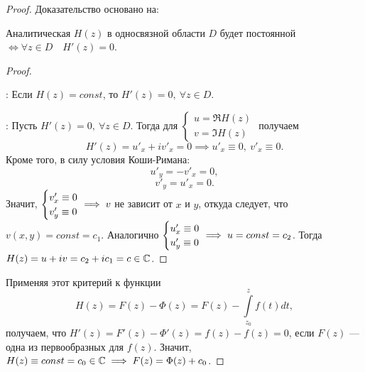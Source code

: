 \documentclass[../../main.tex]{subfiles}
\begin{document}
\begin{proof}
Доказательство основано на:
\begin{thm}
	Аналитическая $H(z)$ в односвязной области $D$ будет постоянной
	$\iff \forall z \in D \quad H'(z) = 0$.
\end{thm}
\begin{proof} ~

\nec:
Если $H(z) = const$, то $H'(z) = 0, \ \forall z \in D$.

\suff:
Пусть $H'(z) = 0, \ \forall z \in D$. Тогда для $\begin{cases}
	u = \Re H(z) \\
	v = \Im H(z)
\end{cases}$ \hspace{-1em} получаем \[H'(z) = u'_x + i v'_x = 0 \implies
u'_x \equiv 0, \ v'_x \equiv 0.\] Кроме того, в силу условия Коши-Римана:
\[ u'_y = -v'_x = 0, \]
\[ v'_y = u'_x = 0.\]
Значит, $\begin{cases} v'_x \equiv 0 \\ v'_y \equiv 0
\end{cases} \hspace{-1em} \implies v $ не зависит от $x$ и $y$, откуда 
следует, что $ v(x, y) = const = c_1 $.
Аналогично $\begin{cases} u'_x \equiv 0 \\ u'_y \equiv 0
\end{cases} \hspace{-1em} \implies u = const = c_2 $.
Тогда $H(z) = u + i v = c_2 + i c_1 = c \in \mathbb{C} $.
\end{proof}

Применяя этот критерий к функции \[ H(z) = F(z) - \Phi(z) = F(z) -
\int\limits_{z_0}^z f(t) dt,\] получаем, что $ H'(z) = F'(z) - \Phi ' (z) =
f(z) - f(z) = 0$, если $F(z)$ --- одна из первообразных для $f(z)$.
Значит, $H(z) \equiv const = c_0 \in \mathbb{C} \implies F(z) = \Phi(z) + c_0$.
\end{proof}
\end{document}
